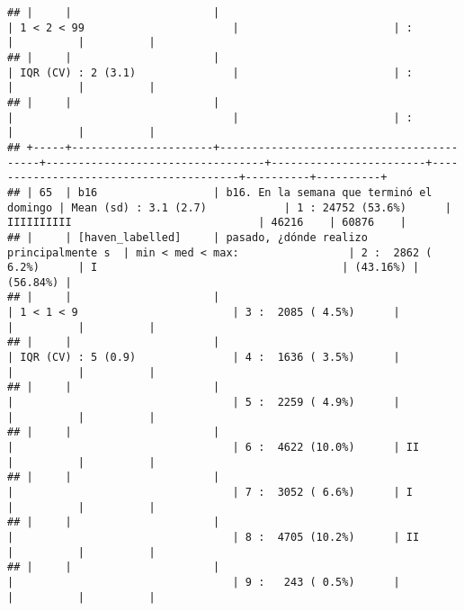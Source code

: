 \documentclass[]{article}
\begin{document}
\begin{verbatim}
## |     |                      |                                          | 1 < 2 < 99                       |                        | :                                      |          |          |
## |     |                      |                                          | IQR (CV) : 2 (3.1)               |                        | :                                      |          |          |
## |     |                      |                                          |                                  |                        | :                                      |          |          |
## +-----+----------------------+------------------------------------------+----------------------------------+------------------------+----------------------------------------+----------+----------+
## | 65  | b16                  | b16. En la semana que terminó el domingo | Mean (sd) : 3.1 (2.7)            | 1 : 24752 (53.6%)      | IIIIIIIIII                             | 46216    | 60876    |
## |     | [haven_labelled]     | pasado, ¿dónde realizo principalmente s  | min < med < max:                 | 2 :  2862 ( 6.2%)      | I                                      | (43.16%) | (56.84%) |
## |     |                      |                                          | 1 < 1 < 9                        | 3 :  2085 ( 4.5%)      |                                        |          |          |
## |     |                      |                                          | IQR (CV) : 5 (0.9)               | 4 :  1636 ( 3.5%)      |                                        |          |          |
## |     |                      |                                          |                                  | 5 :  2259 ( 4.9%)      |                                        |          |          |
## |     |                      |                                          |                                  | 6 :  4622 (10.0%)      | II                                     |          |          |
## |     |                      |                                          |                                  | 7 :  3052 ( 6.6%)      | I                                      |          |          |
## |     |                      |                                          |                                  | 8 :  4705 (10.2%)      | II                                     |          |          |
## |     |                      |                                          |                                  | 9 :   243 ( 0.5%)      |                                        |          |          |

\end{verbatim}
\end{document}
